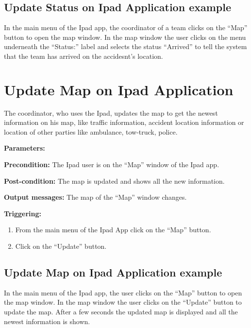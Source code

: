  
\subsection{Update Status on Ipad Application example}
In the main menu of the Ipad app, the coordinator of a team clicks on the “Map”
button to open the map window. In the map window the user clicks on the menu underneath the
“Status:” label and selects the status “Arrived” to tell the system that the
team has arrived on the accidesnt's location.

\section{Update Map on Ipad Application}
\label{operation:MyOperation}
The coordinator, who uses the Ipad, updates the map to get the newest
information on his map, like traffic information, accident location information or location
of other parties like ambulance, tow-truck, police.

\begin{description}

\item \textbf{Parameters:} 
\item \textbf{Precondition:} The Ipad user is on the “Map” window of
the Ipad app.
\item \textbf{Post-condition:} The map is updated and shows all the new
information.
\item \textbf{Output messages:} The map of the “Map” window changes.


\item \textbf{Triggering:}
\begin{enumerate}
  \item From the main menu of the Ipad App click on the “Map” button.
  \item Click on the “Update” button.
\end{enumerate}
 

\end{description}

 
\subsection{Update Map on Ipad Application example}
In the main menu of the Ipad app, the user clicks on the “Map” button to open
the map window. In the map window the user clicks on the “Update” button to
update the map. After a few seconds the updated map is displayed and all the
newest information is shown.
